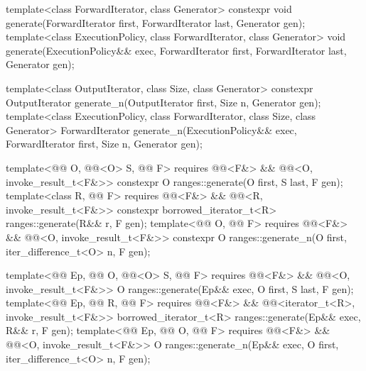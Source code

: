 %
%
\begin{itemdecl}
template<class ForwardIterator, class Generator>
  constexpr void generate(ForwardIterator first, ForwardIterator last,
                          Generator gen);
template<class ExecutionPolicy, class ForwardIterator, class Generator>
  void generate(ExecutionPolicy&& exec,
                ForwardIterator first, ForwardIterator last,
                Generator gen);

template<class OutputIterator, class Size, class Generator>
  constexpr OutputIterator generate_n(OutputIterator first, Size n, Generator gen);
template<class ExecutionPolicy, class ForwardIterator, class Size, class Generator>
  ForwardIterator generate_n(ExecutionPolicy&& exec,
                             ForwardIterator first, Size n, Generator gen);

template<@@ O, @@<O> S, @@ F>
  requires @@<F&> && @@<O, invoke_result_t<F&>>
  constexpr O ranges::generate(O first, S last, F gen);
template<class R, @@ F>
  requires @@<F&> && @@<R, invoke_result_t<F&>>
  constexpr borrowed_iterator_t<R> ranges::generate(R&& r, F gen);
template<@@ O, @@ F>
  requires @@<F&> && @@<O, invoke_result_t<F&>>
  constexpr O ranges::generate_n(O first, iter_difference_t<O> n, F gen);

template<@@ Ep, @@ O, @@<O> S,
         @@ F>
  requires @@<F&> && @@<O, invoke_result_t<F&>>
  O ranges::generate(Ep&& exec, O first, S last, F gen);
template<@@ Ep, @@ R, @@ F>
  requires @@<F&> && @@<iterator_t<R>, invoke_result_t<F&>>
  borrowed_iterator_t<R> ranges::generate(Ep&& exec, R&& r, F gen);
template<@@ Ep, @@ O, @@ F>
  requires @@<F&> && @@<O, invoke_result_t<F&>>
  O ranges::generate_n(Ep&& exec, O first, iter_difference_t<O> n, F gen);
\end{itemdecl}

